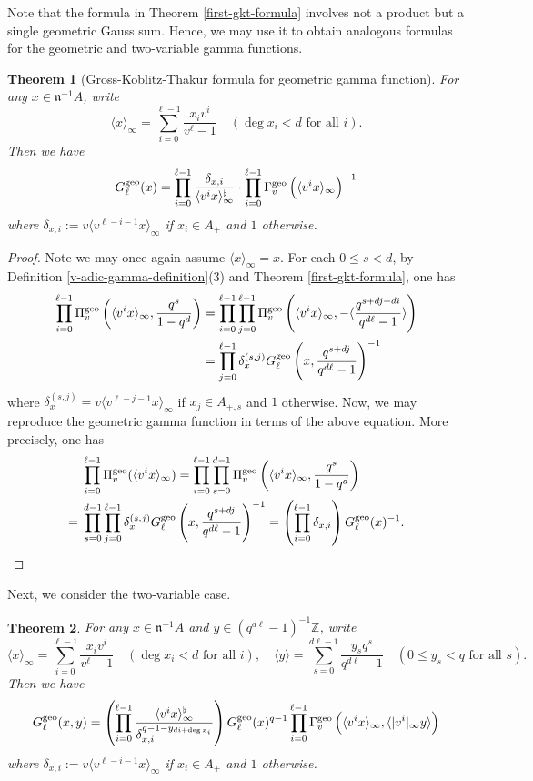 \documentclass[11pt]{amsart}
\theoremstyle{plain}
\newtheorem{thm}{Theorem}[subsection]
\theoremstyle{definition}
\theoremstyle{remark}
\numberwithin{equation}{section}
\newcommand{\ZZ}{\mathbb{Z}}
\newcommand{\nfk}{\mathfrak{n}}
\newcommand{\ang}[1]{\langle #1 \rangle}
\newcommand{\anginf}[1]{\langle #1 \rangle_\infty}
\newcommand{\vgf}{\Pi_v^{\textnormal{geo}}}
\newcommand{\vgg}{\Gamma_v^{\textnormal{geo}}}
\newcommand{\ggs}{G_\l^{\textnormal{geo}}}
\let\l\ell
\begin{document}
	Note that the formula in Theorem \ref{first-gkt-formula} involves not a product but a single geometric Gauss sum.
	Hence, we may use it to obtain analogous formulas for the geometric and two-variable gamma functions.
	
	\begin{thm}[Gross-Koblitz-Thakur formula for geometric gamma function]      \label{gkt-formula-for-geometric-gamma-function}
		For any $x \in \nfk^{-1}A$, write
		$$
		\anginf{x} = \sum_{i=0}^{\l-1} \frac{x_i v^i}{v^\l-1}
		\quad
		(\deg x_i < d \text{ for all } i).
		$$
		Then we have
		$$
		\ggs (x)
		= \prod_{i=0}^{\l-1} \frac{\delta_{x,i}}{\anginf{v^ix}^\flat}
		\cdot
		\prod_{i=0}^{\l-1} \vgg \left( \anginf{v^ix} \right)^{-1}
		$$
		where $\delta_{x,i} := v\anginf{v^{\l-i-1}x}$ if $x_i \in A_+$ and $1$ otherwise.
	\end{thm}
	
	\begin{proof}
		Note we may once again assume $\anginf{x} = x$.
		For each $0 \leq s <d$, by Definition \ref{v-adic-gamma-definition}(3) and Theorem \ref{first-gkt-formula}, one has
		\begin{align*}
			\prod_{i=0}^{\l-1} \vgf \left( \anginf{v^ix}, \frac{q^s}{1-q^d} \right)
			&= \prod_{i=0}^{\l-1} \prod_{j=0}^{\l-1} \vgf \left( \anginf{v^ix}, -\ang{\frac{q^{s+dj+di}}{q^{d\l}-1}} \right)   \\
			&= \prod_{j=0}^{\l-1} \delta_x^{(s,j)} \ggs \left(x, \frac{q^{s+dj}}{q^{d\l}-1}\right)^{-1} 
		\end{align*}
		where $\delta_x^{(s,j)} = v\anginf{v^{\l-j-1}x}$ if $x_j \in A_{+,s}$ and $1$ otherwise.
		Now, we may reproduce the geometric gamma function in terms of the above equation.
		More precisely, one has
		\begin{align}    \label{reflection-for-vgf}
			&\prod_{i=0}^{\l-1} \vgf(\anginf{v^ix})
			= \prod_{i=0}^{\l-1} \prod_{s=0}^{d-1} \vgf \left( \anginf{v^ix}, \frac{q^s}{1-q^d} \right)    \\
			={} &\prod_{s=0}^{d-1}  \prod_{j=0}^{\l-1} \delta_x^{(s,j)} \ggs \left(x, \frac{q^{s+dj}}{q^{d\l}-1}\right)^{-1}
			= \left( \prod_{i=0}^{\l-1} \delta_{x,i} \right) \ggs (x)^{-1}.  \nonumber
		\end{align}
	\end{proof}
	
	Next, we consider the two-variable case.
	
	\begin{thm}   \label{gkt-formula-for-geo-two}
		For any $x \in \nfk^{-1} A$ and $y \in (q^{d\l}-1)^{-1} \ZZ$, write
		$$
		\anginf{x} = \sum_{i=0}^{\l-1} \frac{x_i v^i}{v^\l-1}
		\quad
		(\deg x_i < d \text{ for all } i),
		\quad
		\ang{y} = \sum_{s=0}^{d\l-1} \frac{y_s q^s}{q^{d\l}-1}
		\quad
		(0 \leq y_s < q \text{ for all } s).
		$$
		Then we have
		$$
		\ggs (x,y)
		= \left( \prod_{i=0}^{\l-1}
		\frac{\anginf{v^ix}^\flat}{\delta_{x,i}^{q-1-y_{di+\deg x_i}}} \right)
		\ggs(x)^{q-1}
		\prod_{i=0}^{\l-1} \vgg \left( \anginf{v^ix}, \ang{|v^i|_\infty y} \right)
		$$
		where $\delta_{x,i} := v\anginf{v^{\l-i-1}x}$ if $x_i \in A_+$ and $1$ otherwise.
	\end{thm}
	
\end{document}
